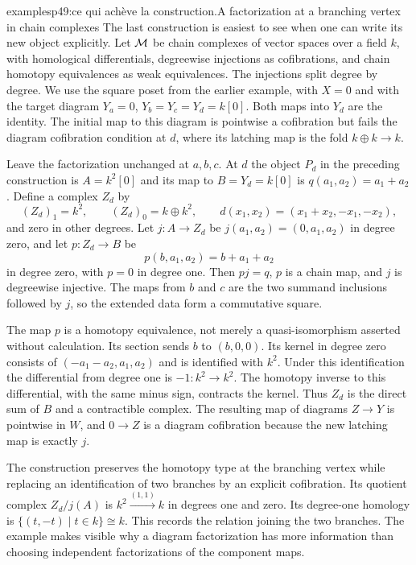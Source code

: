 \begin{dcomment}{examples}{p49:ce qui achève la construction.}{A factorization at a branching vertex in chain complexes}
The last construction is easiest to see when one can write its new object explicitly. Let $\mathcal{M}$ be chain complexes of vector spaces over a field $k$, with homological differentials, degreewise injections as cofibrations, and chain homotopy equivalences as weak equivalences. The injections split degree by degree. We use the square poset from the earlier example, with $X=0$ and with the target diagram $Y_a=0$, $Y_b=Y_c=Y_d=k[0]$. Both maps into $Y_d$ are the identity. The initial map to this diagram is pointwise a cofibration but fails the diagram cofibration condition at $d$, where its latching map is the fold $k\oplus k\to k$.

Leave the factorization unchanged at $a,b,c$. At $d$ the object $P_d$ in the preceding construction is $A=k^2[0]$ and its map to $B=Y_d=k[0]$ is $q(a_1,a_2)=a_1+a_2$. Define a complex $Z_d$ by
\[
 (Z_d)_1=k^2,\qquad (Z_d)_0=k\oplus k^2,
 \qquad d(x_1,x_2)=(x_1+x_2,-x_1,-x_2),
\]
and zero in other degrees. Let $j:A\to Z_d$ be $j(a_1,a_2)=(0,a_1,a_2)$ in degree zero, and let $p:Z_d\to B$ be
\[
 p(b,a_1,a_2)=b+a_1+a_2
\]
in degree zero, with $p=0$ in degree one. Then $pj=q$, $p$ is a chain map, and $j$ is degreewise injective. The maps from $b$ and $c$ are the two summand inclusions followed by $j$, so the extended data form a commutative square.

The map $p$ is a homotopy equivalence, not merely a quasi-isomorphism asserted without calculation. Its section sends $b$ to $(b,0,0)$. Its kernel in degree zero consists of $(-a_1-a_2,a_1,a_2)$ and is identified with $k^2$. Under this identification the differential from degree one is $-1:k^2\to k^2$. The homotopy inverse to this differential, with the same minus sign, contracts the kernel. Thus $Z_d$ is the direct sum of $B$ and a contractible complex. The resulting map of diagrams $Z\to Y$ is pointwise in $W$, and $0\to Z$ is a diagram cofibration because the new latching map is exactly $j$.

The construction preserves the homotopy type at the branching vertex while replacing an identification of two branches by an explicit cofibration. Its quotient complex $Z_d/j(A)$ is $k^2\xrightarrow{(1,1)}k$ in degrees one and zero. Its degree-one homology is $\{(t,-t)\mid t\in k\}\cong k$. This records the relation joining the two branches. The example makes visible why a diagram factorization has more information than choosing independent factorizations of the component maps.
\end{dcomment}


